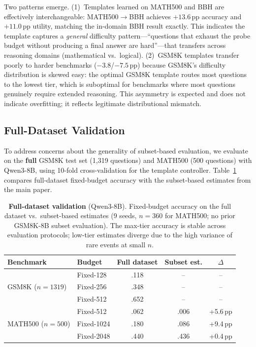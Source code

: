 Two patterns emerge.
(1)~Templates learned on MATH500 and BBH are effectively interchangeable: MATH500$\to$BBH achieves $+13.6$\,pp accuracy and $+11.0$\,pp utility, matching the in-domain BBH result exactly.
This indicates the template captures a \emph{general} difficulty pattern---``questions that exhaust the probe budget without producing a final answer are hard''---that transfers across reasoning domains (mathematical vs.\ logical).
(2)~GSM8K templates transfer poorly to harder benchmarks ($-3.8$/$-7.5$\,pp) because GSM8K's difficulty distribution is skewed easy: the optimal GSM8K template routes most questions to the lowest tier, which is suboptimal for benchmarks where most questions genuinely require extended reasoning.
This asymmetry is expected and does not indicate overfitting; it reflects legitimate distributional mismatch.

\subsection{Full-Dataset Validation}
\label{app:fulltest}

To address concerns about the generality of subset-based evaluation, we evaluate on the \textbf{full} GSM8K test set (1,319 questions) and MATH500 (500 questions) with Qwen3-8B, using 10-fold cross-validation for the template controller.
Table~\ref{tab:fulltest} compares full-dataset fixed-budget accuracy with the subset-based estimates from the main paper.

\begin{table}[ht]
\centering
\caption{\textbf{Full-dataset validation} (Qwen3-8B). Fixed-budget accuracy on the full dataset vs.\ subset-based estimates (9 seeds, $n{=}360$ for MATH500; no prior GSM8K-8B subset evaluation). The max-tier accuracy is stable across evaluation protocols; low-tier estimates diverge due to the high variance of rare events at small $n$.}
\label{tab:fulltest}
\small
\begin{tabular}{@{}llccc@{}}
\toprule
\textbf{Benchmark} & \textbf{Budget} & \textbf{Full dataset} & \textbf{Subset est.} & $\Delta$ \\
\midrule
\multirow{3}{*}{GSM8K ($n{=}1319$)} & Fixed-128 & .118 & -- & -- \\
& Fixed-256 & .348 & -- & -- \\
& Fixed-512 & .652 & -- & -- \\
\midrule
\multirow{3}{*}{MATH500 ($n{=}500$)} & Fixed-512 & .062 & .006 & +5.6\,pp \\
& Fixed-1024 & .180 & .086 & +9.4\,pp \\
& Fixed-2048 & .440 & .436 & +0.4\,pp \\
\bottomrule
\end{tabular}
\end{table}


